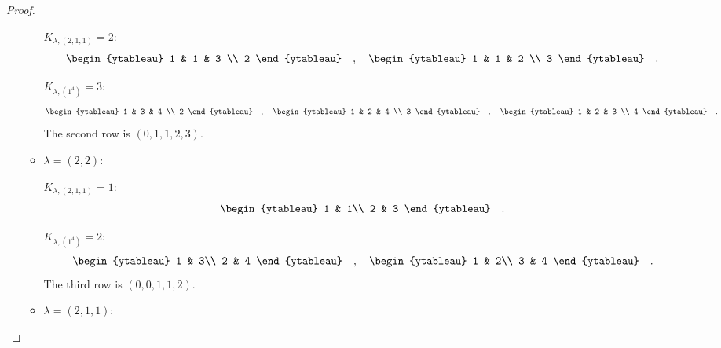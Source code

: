 \documentclass[12pt]{extarticle}
\newcommand{\<}{\langle}
\renewcommand{\>}{\rangle}
\theoremstyle{definition}
\begin{document}
\begin{proof}
\begin{enumerate}
\begin{itemize}
      $K_{\lambda, (2,1,1)} = 2$:
      \begin{align*}
        \begin{ytableau}
          1 & 1 & 3 \\
          2
        \end{ytableau}\quad,\quad
        \begin{ytableau}
          1 & 1 & 2 \\
          3
        \end{ytableau}\quad.
      \end{align*}

      $K_{\lambda, (1^4)} = 3 $:
      \begin{align*}
        \begin{ytableau}
          1 & 3 & 4 \\
          2
        \end{ytableau}\quad,\quad
        \begin{ytableau}
          1 & 2 & 4 \\
          3
        \end{ytableau}\quad,\quad
        \begin{ytableau}
          1 & 2 & 3 \\
          4
        \end{ytableau}\quad.        
      \end{align*}
      The second row is $(0,1,1,2,3)$.
    \item
      $\lambda=(2,2)$:

      $K_{\lambda, (2,1,1)} = 1$:
      \begin{align*}
        \begin{ytableau}
          1 & 1\\
          2 & 3
        \end{ytableau}\quad.
      \end{align*}

      $K_{\lambda, (1^4)} = 2$:
      \begin{align*}
        \begin{ytableau}
          1 & 3\\
          2 & 4
        \end{ytableau}\quad,\quad
        \begin{ytableau}
          1 & 2\\
          3 & 4
        \end{ytableau}\quad.
      \end{align*}
      The third row is $(0,0,1,1,2)$.
    \item
      $\lambda=(2,1,1)$:
      

\end{itemize}
\end{enumerate}
\end{proof}
\end{document}
